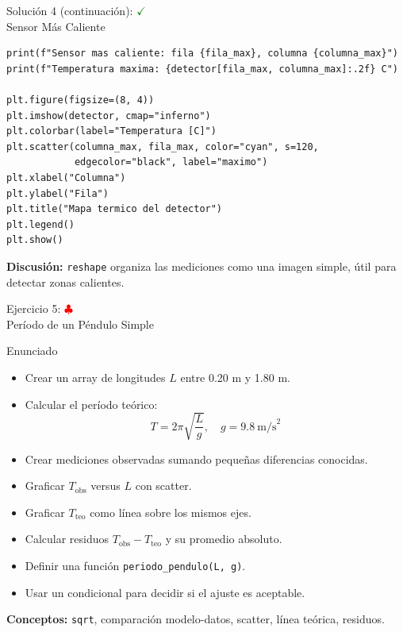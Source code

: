 \documentclass[10pt]{beamer}
\begin{document}
\begin{solutionblock}
\begin{frame}[fragile]{Solución 4 (continuación): \hfill \textcolor{green}{$\checkmark$} \\ Sensor Más Caliente}
\begin{Verbatim}[fontsize=\tiny]
print(f"Sensor mas caliente: fila {fila_max}, columna {columna_max}")
print(f"Temperatura maxima: {detector[fila_max, columna_max]:.2f} C")

plt.figure(figsize=(8, 4))
plt.imshow(detector, cmap="inferno")
plt.colorbar(label="Temperatura [C]")
plt.scatter(columna_max, fila_max, color="cyan", s=120,
            edgecolor="black", label="maximo")
plt.xlabel("Columna")
plt.ylabel("Fila")
plt.title("Mapa termico del detector")
plt.legend()
plt.show()
\end{Verbatim}
\textbf{Discusión:} \texttt{reshape} organiza las mediciones como una imagen simple, útil para detectar zonas calientes.
\end{frame}
\end{solutionblock}

\begin{frame}[shrink=8]{Ejercicio 5: \hfill \textcolor{red}{$\clubsuit$} \\ Período de un Péndulo Simple}
  \begin{block}{Enunciado}
    \begin{itemize}
      \item Crear un array de longitudes \(L\) entre 0.20 m y 1.80 m.
      \item Calcular el período teórico:
        \[
          T = 2\pi\sqrt{\frac{L}{g}}, \quad g=9.8~\text{m/s}^2
        \]
      \item Crear mediciones observadas sumando pequeñas diferencias conocidas.
      \item Graficar \(T_{\text{obs}}\) versus \(L\) con scatter.
      \item Graficar \(T_{\text{teo}}\) como línea sobre los mismos ejes.
      \item Calcular residuos \(T_{\text{obs}}-T_{\text{teo}}\) y su promedio absoluto.
      \item Definir una función \texttt{periodo\_pendulo(L, g)}.
      \item Usar un condicional para decidir si el ajuste es aceptable.
    \end{itemize}
  \end{block}
  \textbf{Conceptos:} \texttt{sqrt}, comparación modelo-datos, scatter, línea teórica, residuos.
\end{frame}
\end{document}
